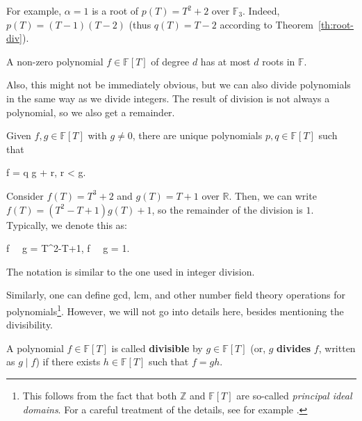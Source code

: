 \documentclass[../../book.tex]{subfiles}
\begin{document}
\begin{example}
    For example, $\alpha=1$ is a root of $p(T) = T^2+2$ over $\mathbb{F}_3$. Indeed, $p(T) = (T-1)(T-2)$ (thus $q(T) = T - 2$ according to Theorem~\ref{th:root-div}).
\end{example}

\begin{corollary}\label{cor:root-count}
    A non-zero polynomial $f \in \mathbb{F}[T]$ of degree $d$ has at most $d$ roots in $\mathbb{F}$.
\end{corollary}

Also, this might not be immediately obvious, but we can also divide polynomials in the same way as we divide integers. The result of division is not always a polynomial, so we also get a remainder.

\begin{theorem}
    Given $f,g \in \mathbb{F}[T]$ with $g \neq 0$, there are unique polynomials $p,q \in \mathbb{F}[T]$ such that 
    \begin{xequation}
        f = q \cdot g + r,  \leq \deg r < \deg g.
    \end{xequation}
\end{theorem}

\begin{example}
    Consider $f(T) = T^3+2$ and $g(T) = T+1$ over $\mathbb{R}$. Then, we can write $f(T) = (T^2-T+1)g(T) + 1$, so the remainder of the division is $1$. Typically, we denote this as:
    \begin{xequation*}
        f \,  \, g = T^2-T+1, \quad f \,  \, g = 1.
    \end{xequation*}

    The notation is similar to the one used in integer division.
\end{example}

Similarly, one can define $\text{gcd}$, $\text{lcm}$, and other number field theory operations for polynomials\footnote{This follows from the fact that both $\mathbb{Z}$ and $\mathbb{F}[T]$ are so-called \textit{principal ideal domains}. For a careful treatment of the details, see for example \cite[Chapters 1 \& 2]{ireland}.}. However, we will not go into details here, besides mentioning the divisibility.

\begin{definition}
    A polynomial $f \in \mathbb{F}[T]$ is called \textbf{divisible} by $g \in \mathbb{F}[T]$ (or, $g$ \textbf{divides} $f$, written as $g \mid f$) if there exists $h \in \mathbb{F}[T]$ such that $f=gh$.
\end{definition}
\end{document}
